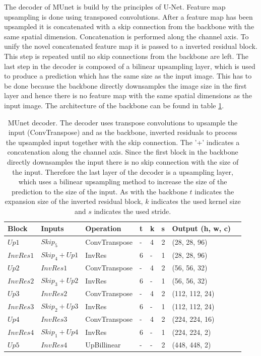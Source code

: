 The decoder of \ac{MUnet} is build by the principles of U-Net\cite{unet}.
Feature map upsampling is done using transposed convolutions.
After a feature map has been upsampled it is concatenated with a skip connection from the backbone with the same spatial dimension.
Concatenation is performed along the channel axis.
To unify the novel concatenated feature map it is passed to a inverted residual block.
This step is repeated until no skip connections from the backbone are left.
The last step in the decoder is composed of a bilinear upsampling layer, which is used to produce a prediction which has the same size as the input image.
This has to be done because the backbone directly downsamples the image size in the first layer and hence there is no feature map with the same spatial dimensions as the input image.
The architecture of the backbone can be found in table \ref{tab:mobilenetv2_decoder}.

\begin{table} %
\begin{center}

\begin{tabular}{l|l|l|l|l|l|l|l}
\textbf{Block} & \textbf{Inputs} & \textbf{Operation} & \textbf{t} & \textbf{k} & \textbf{s} & \textbf{Output (h, w, c)}\\
\hline
$Up1$     & $Skip_5$        & ConvTranspose & - & 4 & 2 & (28, 28, 96) \\
$InvRes1$ & $Skip_4 + Up1$  & InvRes        & 6 & - & 1 & (28, 28, 96) \\
$Up2$     & $InvRes1$       & ConvTranspose & - & 4 & 2 & (56, 56, 32) \\
$InvRes2$ & $Skip_3 + Up2$  & InvRes        & 6 & - & 1 & (56, 56, 32) \\
$Up3$     & $InvRes2$       & ConvTranspose & - & 4 & 2 & (112, 112, 24) \\
$InvRes3$ & $Skip_2 + Up3$  & InvRes        & 6 & - & 1 & (112, 112, 24) \\
$Up4$     & $InvRes3$       & ConvTranspose & - & 4 & 2 & (224, 224, 16) \\
$InvRes4$ & $Skip_1 + Up4$  & InvRes        & 6 & - & 1 & (224, 224, 2) \\
$Up5$     & $InvRes4$       & UpBillinear   & - & - & 2 & (448, 448, 2) \\
\end{tabular}

\caption{\ac{MUnet} decoder. The decoder uses transpose convolutions to upsample the input (ConvTranspose) and as the backbone, inverted residuals to process the upsampled input together with the skip connection. The '+' indicates a concatenation along the channel axis. Since the first block in the backbone directly downsamples the input there is no skip connection with the size of the input. Therefore the last layer of the decoder is a upsampling layer, which uses a bilinear upsampling method to increase the size of the prediction to the size of the input. As with the backbone $t$ indicates the expansion size of the inverted residual block, $k$ indicates the used kernel size and $s$ indicates the used stride.}
\label{tab:mobilenetv2_decoder}
\end{center}
\end{table}
